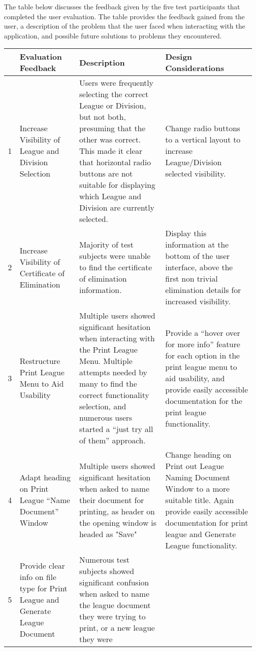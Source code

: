 The table below discusses the feedback given by the five test participants that
completed the user evaluation. The table provides the feedback gained from the
user, a description of the problem that the user faced when interacting with
the application, and possible future solutions to problems they encountered.

\begin{table}[t]
\begin{tabular}{|l|p{}|p{}|p{}|}
\hline
 & Evaluation Feedback & Description & Design Considerations  \\
\hline
1 & Increase Visibility of League and Division Selection & Users were frequently
selecting the correct League or Division, but not both, presuming that the other
was correct. This made it clear that horizontal radio buttons are not suitable
for displaying which League and Division are currently selected. & Change radio
buttons to a vertical layout to increase League/Division selected visibility.\\
\hline
2 & Increase Visibility of Certificate of Elimination & Majority of test
subjects were unable to find the certificate of elimination information. &
Display this information at the bottom of the user interface, above the first
non trivial elimination details for increased visibility.\\
\hline
3 & Restructure Print League Menu to Aid Usability & Multiple users showed
significant hesitation when interacting with the Print League Menu. Multiple
attempts needed by many to find the correct functionality selection, and
numerous users started a ``just try all of them'' approach. & Provide a ``hover
over for more info'' feature for each option in the print league menu to aid
usability, and provide easily accessible documentation for the print league
functionality.\\
\hline
4 & Adapt heading on Print League ``Name Document'' Window & Multiple users
showed significant hesitation when asked to name their document for printing, as
header on the opening window is headed as "Save" & Change heading on Print out
League Naming Document Window to a more suitable title. Again provide easily
accessible documentation for print league and Generate League functionality.\\
\hline
5 & Provide clear info on file type for Print League and Generate League
Document & Numerous test subjects showed significant confusion when asked to
name the league document they were trying to print, or a new league they were

\end{tabular}
\end{table}
